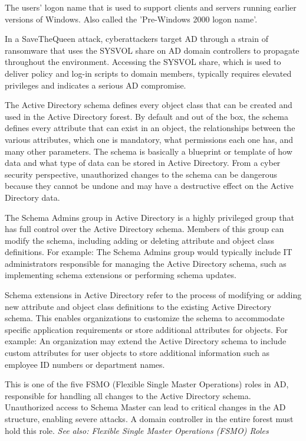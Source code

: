  The users’ logon name that is used to support clients and servers running earlier versions of Windows. Also called the 'Pre-Windows 2000 logon name'.

 In a SaveTheQueen attack, cyberattackers target AD through a strain of ransomware that uses the SYSVOL share on AD domain controllers to propagate throughout the environment. Accessing the SYSVOL share, which is used to deliver policy and log-in scripts to domain members, typically requires elevated privileges and indicates a serious AD compromise.

 The Active Directory schema defines every object class that can be created and used in the Active Directory forest. By default and out of the box, the schema defines every attribute that can exist in an object, the relationships between the various attributes, which one is mandatory, what permissions each one has, and many other parameters. The schema is basically a blueprint or template of how data and what type of data can be stored in Active Directory. From a cyber security perspective, unauthorized changes to the schema can be dangerous because they cannot be undone and may have a destructive effect on the Active Directory data.

 The Schema Admins group in Active Directory is a highly privileged group that has full control over the Active Directory schema. Members of this group can modify the schema, including adding or deleting attribute and object class definitions. For example: The Schema Admins group would typically include IT administrators responsible for managing the Active Directory schema, such as implementing schema extensions or performing schema updates.

 Schema extensions in Active Directory refer to the process of modifying or adding new attribute and object class definitions to the existing Active Directory schema. This enables organizations to customize the schema to accommodate specific application requirements or store additional attributes for objects. For example: An organization may extend the Active Directory schema to include custom attributes for user objects to store additional information such as employee ID numbers or department names.

 This is one of the five FSMO (Flexible Single Master Operations) roles in AD, responsible for handling all changes to the Active Directory schema. Unauthorized access to Schema Master can lead to critical changes in the AD structure, enabling severe attacks. A domain controller in the entire forest must hold this role.
\textit{See also: Flexible Single Master Operations (FSMO) Roles}

